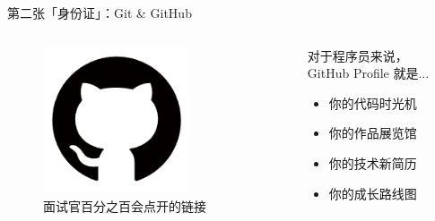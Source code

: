 \documentclass{beamer}
\begin{document}
\begin{frame}{第二张「身份证」：Git \& GitHub}
    \begin{columns}[T]
        \begin{column}{0.5\textwidth}
            \begin{figure}
                \includegraphics[width=0.7\textwidth]{assets/github.png}
                \caption{面试官百分之百会点开的链接}
            \end{figure}
        \end{column}
        
        \begin{column}{0.5\textwidth}
            \Large
            对于程序员来说，\\
            GitHub Profile 就是...
            \vfill

            \begin{itemize}
                \item \huge 你的代码时光机
                \vfill
                \item \huge 你的作品展览馆
                \vfill
                \item \huge \alert{你的技术新简历}
                \vfill
                \item \huge 你的成长路线图
            \end{itemize}
        \end{column}
    \end{columns}

\end{frame}
\end{document}
